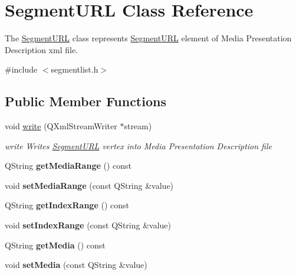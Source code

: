\hypertarget{class_segment_u_r_l}{\section{Segment\-U\-R\-L Class Reference}
\label{class_segment_u_r_l}
}


The \hyperlink{class_segment_u_r_l}{Segment\-U\-R\-L} class represents \hyperlink{class_segment_u_r_l}{Segment\-U\-R\-L} element of Media Presentation Description xml file.  




{\ttfamily \#include $<$segmentlist.\-h$>$}

\subsection*{Public Member Functions}
\begin{DoxyCompactItemize}
\item 
void \hyperlink{class_segment_u_r_l_a1b0a3323d916f75d9f049e158e1f19fb}{write} (Q\-Xml\-Stream\-Writer $\ast$stream)
\begin{DoxyCompactList}\small\item\em write Writes \hyperlink{class_segment_u_r_l}{Segment\-U\-R\-L} vertex into Media Presentation Description file \end{DoxyCompactList}\item 
\hypertarget{class_segment_u_r_l_aaff5024ceaf34af893d366c170e065a5}{Q\-String {\bfseries get\-Media\-Range} () const }\label{class_segment_u_r_l_aaff5024ceaf34af893d366c170e065a5}

\item 
\hypertarget{class_segment_u_r_l_aad5fd4b90da890311b0b5882bb912153}{void {\bfseries set\-Media\-Range} (const Q\-String \&value)}\label{class_segment_u_r_l_aad5fd4b90da890311b0b5882bb912153}

\item 
\hypertarget{class_segment_u_r_l_a151a56d23ff7259b7972a99f46746612}{Q\-String {\bfseries get\-Index\-Range} () const }\label{class_segment_u_r_l_a151a56d23ff7259b7972a99f46746612}

\item 
\hypertarget{class_segment_u_r_l_aa396e1783ada5d362e0553b56bbe8544}{void {\bfseries set\-Index\-Range} (const Q\-String \&value)}\label{class_segment_u_r_l_aa396e1783ada5d362e0553b56bbe8544}

\item 
\hypertarget{class_segment_u_r_l_a56e61174dab524ec9b76fe000a325db4}{Q\-String {\bfseries get\-Media} () const }\label{class_segment_u_r_l_a56e61174dab524ec9b76fe000a325db4}

\item 
\hypertarget{class_segment_u_r_l_a06e13abf9ddf6d11ca48935b8d62e7dc}{void {\bfseries set\-Media} (const Q\-String \&value)}\label{class_segment_u_r_l_a06e13abf9ddf6d11ca48935b8d62e7dc}

\end{DoxyCompactItemize}


